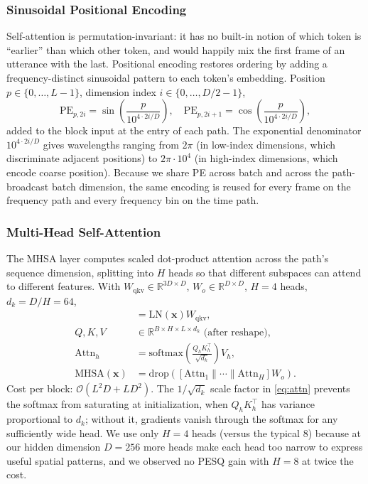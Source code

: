 \documentclass[journal,10pt]{IEEEtran}
\newcommand{\R}{\mathbb{R}}
\newcommand{\bx}{\mathbf{x}}
\newcommand{\LN}{\mathrm{LN}}
\newcommand{\softmax}{\mathrm{softmax}}
\begin{document}
\subsubsection{Sinusoidal Positional Encoding}
Self-attention is permutation-invariant: it has no built-in notion of which token is ``earlier'' than which other token, and would happily mix the first frame of an utterance with the last. Positional encoding restores ordering by adding a frequency-distinct sinusoidal pattern to each token's embedding. Position \(p\in\{0,\dots,L-1\}\), dimension index \(i\in\{0,\dots,D/2-1\}\),
\begin{equation}
\mathrm{PE}_{p,2i}=\sin\!\left(\frac{p}{10^{4\cdot 2i/D}}\right),\quad
\mathrm{PE}_{p,2i+1}=\cos\!\left(\frac{p}{10^{4\cdot 2i/D}}\right),
\label{eq:pe}
\end{equation}
added to the block input at the entry of each path. The exponential denominator \(10^{4\cdot 2i/D}\) gives wavelengths ranging from \(2\pi\) (in low-index dimensions, which discriminate adjacent positions) to \(2\pi\!\cdot\!10^4\) (in high-index dimensions, which encode coarse position). Because we share PE across batch and across the path-broadcast batch dimension, the same encoding is reused for every frame on the frequency path and every frequency bin on the time path.

\subsubsection{Multi-Head Self-Attention}
The MHSA layer computes scaled dot-product attention across the path's sequence dimension, splitting into \(H\) heads so that different subspaces can attend to different features. With \(W_{\mathrm{qkv}}\in\R^{3D\times D}\), \(W_o\in\R^{D\times D}\), \(H=4\) heads, \(d_k=D/H=64\),
\begin{align}
[Q\|K\|V]&=\LN(\bx)W_{\mathrm{qkv}},\\
Q,K,V&\in\R^{B\times H\times L\times d_k}\text{ (after reshape)},\\
\mathrm{Attn}_h&=\softmax\!\left(\frac{Q_h K_h^\top}{\sqrt{d_k}}\right)V_h,\label{eq:attn}\\
\mathrm{MHSA}(\bx)&=\mathrm{drop}\!\left([\mathrm{Attn}_1\|\cdots\|\mathrm{Attn}_H]W_o\right)\!.
\end{align}
Cost per block: \(\mathcal{O}(L^2 D + LD^2)\). The \(1/\sqrt{d_k}\) scale factor in \eqref{eq:attn} prevents the softmax from saturating at initialization, when \(Q_h K_h^\top\) has variance proportional to \(d_k\); without it, gradients vanish through the softmax for any sufficiently wide head. We use only \(H=4\) heads (versus the typical \(8\)) because at our hidden dimension \(D=256\) more heads make each head too narrow to express useful spatial patterns, and we observed no PESQ gain with \(H=8\) at twice the cost.
\end{document}
